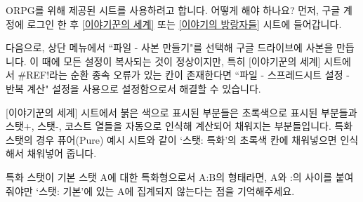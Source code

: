\documentclass{report}
\begin{document}
	\bigskip
	
	\begin{faq}{ORPG를 위해 제공된 시트를 사용하려고 합니다. 어떻게 해야 하나요?}
		먼저, 구글 계정에 로그인 한 후 \href{https://docs.google.com/spreadsheets/d/1g3ZO-oALMVbytbE2tvSBdT6czxB32XHZ1crWIGavEhQ/edit?usp=sharing}{[이야기꾼의 세계]} 또는 \href{https://docs.google.com/spreadsheets/d/14xSfMVRGJlXmEfHmg3_xD5Mbd9HLniCgCktDBgF5O44/edit?usp=sharing}{[이야기의 방랑자들]} 시트에 들어갑니다.
		
		다음으로, 상단 메뉴에서 ``파일 - 사본 만들기"를 선택해 구글 드라이브에 사본을 만듭니다. 이 때에 모든 설정이 복사되는 것이 정상이지만, 특히 [이야기꾼의 세계] 시트에서 \#REF!라는 순환 종속 오류가 있는 칸이 존재한다면 ``파일 - 스프레드시트 설정 - 반복 계산" 설정을 사용으로 설정함으로서 해결할 수 있습니다.
		
		[이야기꾼의 세계] 시트에서 붉은 색으로 표시된 부분들은 초록색으로 표시된 부분들과 스탯+, 스탯-, 코스트 열들을 자동으로 인식해 계산되어 채워지는 부분들입니다. 특화 스탯의 경우 퓨어(Pure) 예시 시트와 같이 `스탯: 특화'의 초록색 칸에 채워넣으면 인식해서 채워넣어 줍니다.
		
		특화 스탯이 기본 스탯 A에 대한 특화형으로서 A:B의 형태라면, A와 :의 사이를 붙여줘야만 `스탯: 기본'에 있는 A에 집계되지 않는다는 점을 기억해주세요.
	\end{faq}
\end{document}
